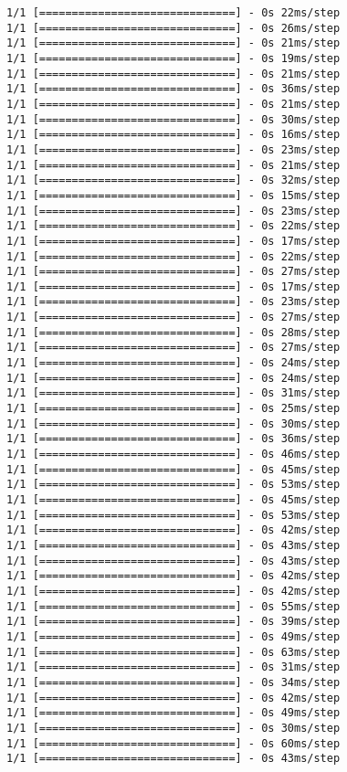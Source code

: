 \documentclass[11pt]{article}
\begin{document}
\begin{Verbatim}[commandchars=\\\{\}]
1/1 [==============================] - 0s 22ms/step
1/1 [==============================] - 0s 26ms/step
1/1 [==============================] - 0s 21ms/step
1/1 [==============================] - 0s 19ms/step
1/1 [==============================] - 0s 21ms/step
1/1 [==============================] - 0s 36ms/step
1/1 [==============================] - 0s 21ms/step
1/1 [==============================] - 0s 30ms/step
1/1 [==============================] - 0s 16ms/step
1/1 [==============================] - 0s 23ms/step
1/1 [==============================] - 0s 21ms/step
1/1 [==============================] - 0s 32ms/step
1/1 [==============================] - 0s 15ms/step
1/1 [==============================] - 0s 23ms/step
1/1 [==============================] - 0s 22ms/step
1/1 [==============================] - 0s 17ms/step
1/1 [==============================] - 0s 22ms/step
1/1 [==============================] - 0s 27ms/step
1/1 [==============================] - 0s 17ms/step
1/1 [==============================] - 0s 23ms/step
1/1 [==============================] - 0s 27ms/step
1/1 [==============================] - 0s 28ms/step
1/1 [==============================] - 0s 27ms/step
1/1 [==============================] - 0s 24ms/step
1/1 [==============================] - 0s 24ms/step
1/1 [==============================] - 0s 31ms/step
1/1 [==============================] - 0s 25ms/step
1/1 [==============================] - 0s 30ms/step
1/1 [==============================] - 0s 36ms/step
1/1 [==============================] - 0s 46ms/step
1/1 [==============================] - 0s 45ms/step
1/1 [==============================] - 0s 53ms/step
1/1 [==============================] - 0s 45ms/step
1/1 [==============================] - 0s 53ms/step
1/1 [==============================] - 0s 42ms/step
1/1 [==============================] - 0s 43ms/step
1/1 [==============================] - 0s 43ms/step
1/1 [==============================] - 0s 42ms/step
1/1 [==============================] - 0s 42ms/step
1/1 [==============================] - 0s 55ms/step
1/1 [==============================] - 0s 39ms/step
1/1 [==============================] - 0s 49ms/step
1/1 [==============================] - 0s 63ms/step
1/1 [==============================] - 0s 31ms/step
1/1 [==============================] - 0s 34ms/step
1/1 [==============================] - 0s 42ms/step
1/1 [==============================] - 0s 49ms/step
1/1 [==============================] - 0s 30ms/step
1/1 [==============================] - 0s 60ms/step
1/1 [==============================] - 0s 43ms/step

\end{Verbatim}
\end{document}
